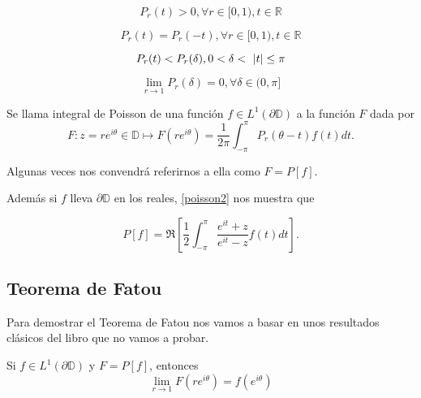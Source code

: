 \begin{equation}
    P_r(t) > 0, \forall r \in [0,1), t \in \mathbb{R}
\end{equation}

\begin{equation}
    P_r(t) = P_r(-t), \forall r \in [0,1), t \in \mathbb{R}
\end{equation}

\begin{equation}
    P_r(t) < P_r(\delta), 0 < \delta < \abs{t} \leq \pi
\end{equation}

\begin{equation}
    \lim_{r \rightarrow 1} P_r(\delta) = 0, \forall \delta \in (0,\pi]
\end{equation}

\bigskip \par

\begin{definition}
    Se llama integral de Poisson de una función $f \in L^1(\partial \mathbb{D})$ a la función $F$ dada por
    \begin{equation*}
        F: z=re^{i \theta} \in \mathbb{D} \mapsto F(re^{i \theta}) = \dfrac{1}{2 \pi} \int_{- \pi}^{\pi} P_r (\theta - t) f(t) dt.
    \end{equation*}

    Algunas veces nos convendrá referirnos a ella como $F=P[f]$.
\end{definition}

\bigskip

Además si $f$ lleva $\partial \mathbb{D}$ en los reales, \ref{poisson2} nos muestra que

\begin{equation*}
     P[f] = \Re \left[ \dfrac{1}{2} \int_{-\pi}^{\pi} \dfrac{e^{it} + z}{e^{it} - z} f(t) dt \right].
\end{equation*}

\subsection{Teorema de Fatou}

Para demostrar el Teorema de Fatou nos vamos a basar en unos resultados clásicos del libro \citet[chap. 11]{rudin} que no vamos a probar.

\begin{theorem}
    \label{fatouaux1}
    Si $f \in L^1(\partial \mathbb{D})$ y $F = P[f]$, entonces
    \begin{equation*}
        \lim_{r \rightarrow 1} F(re^{i \theta}) = f(e^{i \theta})
    \end{equation*}
\end{theorem}

